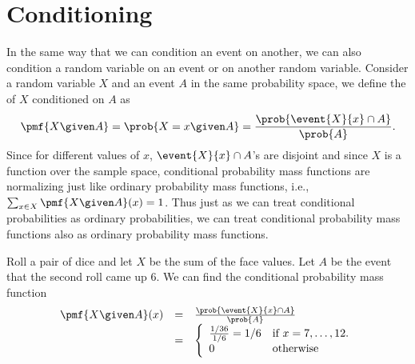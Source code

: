 \section{Conditioning}
\label{sec:probability::randvar::conditioning}

\begin{flex}
\label{grp:grm:probability::randvar::condition}

\begin{gram}
\label{grm:probability::randvar::condition}
In the same way that we can condition an event on another, we can also
condition a random variable on an event or on another random variable.
Consider a random variable $X$ and an event $A$ in the same probability
space, we define the  of
$X$ conditioned on  $A$ as 
\[
\pmf{X \given A} = \prob{X = x \given A} = \frac{\prob{\event{X}{x} \cap A}}{\prob{A}}.
\]
Since for different values of $x$, $\event{X}{x} \cap A$'s are
disjoint and since $X$ is a function over the sample space,
conditional probability mass functions are normalizing just like
ordinary probability mass functions, i.e., $\sum_{x \in X}{\pmf{X \given A}(x)} = 1$.
Thus just as we can treat conditional probabilities as ordinary
probabilities, we can treat conditional probability  mass functions
also as ordinary probability mass functions.

\end{gram}

\begin{example}
\label{xmpl:probability::randvar::roll}
Roll a pair of dice and let $X$ be the sum of the face values.  Let
$A$ be the event that the second roll came up $6$.
We can find the conditional probability mass function 
\[
\begin{array}{lll}
\pmf{X \given A}(x) & = & \frac{\prob{\event{X}{x} \cap A}}{\prob{A}}
\\
& = & 
\left\{
\begin{array}{ll}
\frac{1/36}{1/6} = 1/6 & \mbox{if}~x = 7,  \ldots, 12.
\\
0 & \mbox{otherwise}
\end{array}
\right.
\end{array}
\]
 

\end{example}
\end{flex}

